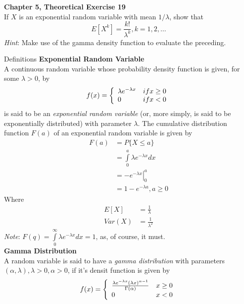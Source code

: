 \documentclass{article}
\begin{document}
\begin{spacing}{1.1}
\newpage
\begin{homeworkProblem}
  {\bf Chapter 5, Theoretical Exercise 19}\\
  If $X$ is an exponential random variable with mean $1/\lambda$, show that
  \[E[ X^k] = \frac{ k!}{ \lambda^k}, k = 1, 2, \dots\]
  \emph{Hint}: Make use of the gamma density function to evaluate the preceding.
  \begin{homeworkSection}{Definitions}
    {\bf Exponential Random Variable}\\
    A continuous random variable whose probability density 
    function is given, for some $\lambda > 0$, by
      \[
        f(x) = \left\{
          \begin{array}{l l}
            \lambda e^{-\lambda x} &if x \ge 0\\
            0 &if x < 0
          \end{array} \right.
      \]
    is said to be an \emph{exponential random variable} (or, more simply, 
    is said to be exponentially distributed) with parameter $\lambda$. 
    The cumulative distribution function $F( a)$ of an exponential 
    random variable is given by
      \begin{align*}
        F(a) &= P\{ X \le a \}\\
        &= \int\limits_0^a \lambda e^{-\lambda x} dx\\
        &= \left.-e^{-\lambda x}\right|_0^a\\
        &= 1 - e^{-\lambda a},  a \ge 0
      \end{align*}
    Where
      \begin{align*}
        E[ X] &= \frac{ 1}{ \lambda}\\
        Var( X) &= \frac{ 1}{ \lambda^2}
      \end{align*}
    \emph{Note}: $F(q) = \int\limits_0^\infty \lambda e^{-\lambda x} dx = 1$, 
    as, of course, it must.\\
    {\bf Gamma Distribution}\\
    A random variable is said to have a \emph{gamma distribution} with parameters
    $(\alpha, \lambda), \lambda > 0, \alpha > 0$, if it's densit function
    is given by
    \[
      f( x) = \left\{
        \begin{array}{l l}
        \frac{ \lambda e^{-\lambda x} (\lambda x)^{\alpha - 1}}
             { \Gamma( \alpha)} &x \ge 0\\
        0 &x < 0 
        \end{array} \right.
\]
\end{homeworkSection}
\end{homeworkProblem}
\end{spacing}
\end{document}
